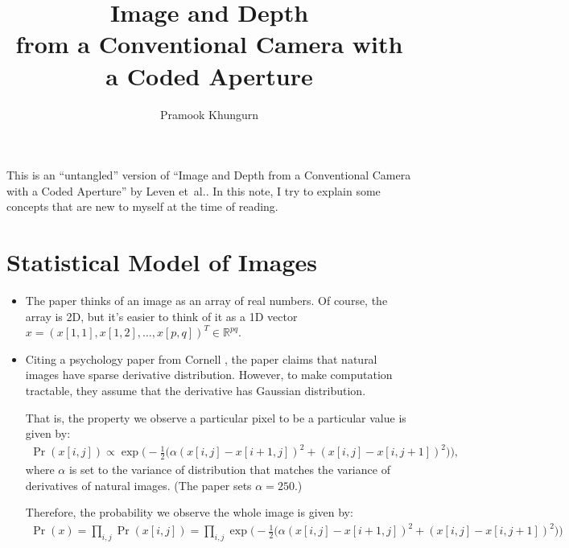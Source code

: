 \documentclass[10pt]{article}
\title{Image and Depth\\ from a Conventional Camera with a Coded Aperture}
\author{Pramook Khungurn}
\newcommand{\etal}{{et~al.}}
\begin{document}
	\maketitle	
	
	This is an ``untangled'' version of ``Image and Depth from a Conventional Camera with a Coded Aperture'' by Leven \etal \cite{Levin:2007}. In this note, I try to explain some concepts that are new to myself at the time of reading.
	
\section{Statistical Model of Images}\label{sec:statistical_model_of_images} %

\begin{itemize}
  \item The paper thinks of an image as an array of real numbers. Of course, the array is 2D, but it's easier to think of it as a 1D vector $x = (x[1,1], x[1,2], \dotsc, x[p,q])^T \in \mathbb{R}^{pq}$.
  
  \item Citing a psychology paper from Cornell \cite{Olshausen1996}, the paper claims that natural images have sparse derivative distribution. However, to make computation tractable, they assume that the derivative has Gaussian distribution.
  
  That is, the property we observe a particular pixel to be a particular value is given by:
  \begin{align*}
    \Pr(x[i,j]) \propto \exp\bigg(-\frac{1}{2}\big( \alpha (x[i,j] - x[i+1,j])^2 + (x[i,j] - x[i,j+1])^2 \big) \bigg),
  \end{align*}
  where $\alpha$ is set to the variance of distribution that matches the variance of derivatives of natural images. (The paper sets $\alpha = 250$.)
  
  Therefore, the probability we observe the whole image is given by:
  \begin{align*}
    \Pr(x) = \prod_{i,j} \Pr(x[i,j]) = \prod_{i,j} \exp\bigg(-\frac{1}{2}\big( \alpha (x[i,j] - x[i+1,j])^2 + (x[i,j] - x[i,j+1])^2 \big) \bigg)
  \end{align*}
  

\end{itemize}
\end{document}
